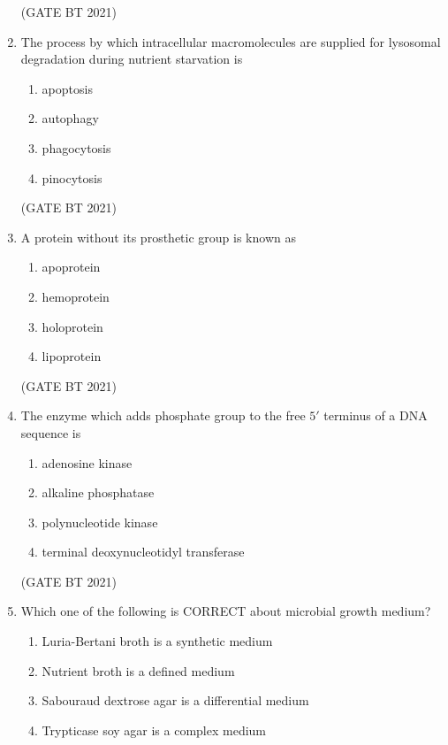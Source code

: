 \documentclass[journal,12pt,onecolumn]{IEEEtran}
\theoremstyle{remark}
\begin{document}
\begin{enumerate}
\hfill (GATE BT 2021)

\item The process by which intracellular macromolecules are supplied for lysosomal degradation during nutrient starvation is

\begin{enumerate}
\item apoptosis
\item autophagy
\item phagocytosis
\item pinocytosis
\end{enumerate}

\hfill (GATE BT 2021)

\item A protein without its prosthetic group is known as

\begin{enumerate}
\item apoprotein
\item hemoprotein
\item holoprotein
\item lipoprotein
\end{enumerate}

\hfill (GATE BT 2021)

\item The enzyme which adds phosphate group to the free $5'$ terminus of a DNA sequence is

\begin{enumerate}
\item adenosine kinase
\item alkaline phosphatase
\item polynucleotide kinase
\item terminal deoxynucleotidyl transferase
\end{enumerate}

\hfill (GATE BT 2021)

\item Which one of the following is CORRECT about microbial growth medium?

\begin{enumerate}
\item Luria-Bertani broth is a synthetic medium
\item Nutrient broth is a defined medium
\item Sabouraud dextrose agar is a differential medium
\item Trypticase soy agar is a complex medium
\end{enumerate}


\end{enumerate}
\end{document}
